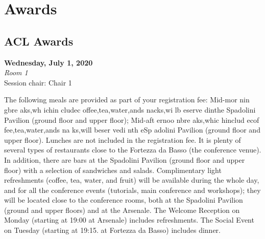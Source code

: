 \chapter{Awards}

\section{ACL Awards}
\vspace*{0.2cm}
\textbf{Wednesday, July 1, 2020}\\
\textit{Room 1}\\
\Large{Session chair: Chair 1}\\
\vspace*{0.2cm}

The following meals are provided as part of your registration fee:
Mid-mor nin gbre aks,wh ichin cludec offee,tea,water,ands nacks,wi lb eserve dinthe Spadolini Pavilion (ground floor and upper floor);
Mid-aft ernoo nbre aks,whic hinclud ecof fee,tea,water,ands na ks,will beser vedi nth eSp adolini Pavilion (ground floor and upper floor).
Lunches are not included in the registration fee. It is plenty of several types of restaurants close to the Fortezza da Basso (the conference venue). In addition, there are bars at the Spadolini Pavilion (ground floor and upper floor) with a selection of sandwiches and salads.
Complimentary light refreshments (coffee, tea, water, and fruit) will be available during the whole day, and for all the conference events (tutorials, main conference and workshops); they will be located close to the conference rooms, both at the Spadolini Pavilion (ground and upper floors) and at the Arsenale.
The Welcome Reception on Monday (starting at 19:00 at Arsenale) includes refreshments. The Social Event on Tuesday (starting at 19:15. at Fortezza da Basso) includes dinner.